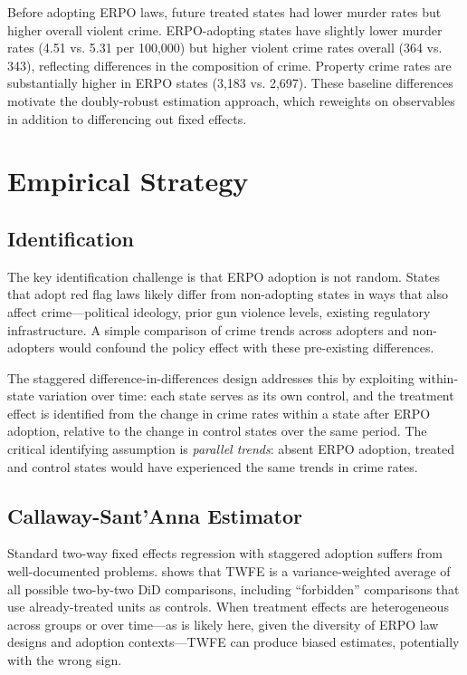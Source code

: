 \documentclass[12pt]{article}
\begin{document}
Before adopting ERPO laws, future treated states had lower murder rates but higher overall violent crime. ERPO-adopting states have slightly lower murder rates (4.51 vs. 5.31 per 100,000) but higher violent crime rates overall (364 vs. 343), reflecting differences in the composition of crime. Property crime rates are substantially higher in ERPO states (3,183 vs. 2,697). These baseline differences motivate the doubly-robust estimation approach, which reweights on observables in addition to differencing out fixed effects.


\section{Empirical Strategy}

\subsection{Identification}

The key identification challenge is that ERPO adoption is not random. States that adopt red flag laws likely differ from non-adopting states in ways that also affect crime---political ideology, prior gun violence levels, existing regulatory infrastructure. A simple comparison of crime trends across adopters and non-adopters would confound the policy effect with these pre-existing differences.

The staggered difference-in-differences design addresses this by exploiting within-state variation over time: each state serves as its own control, and the treatment effect is identified from the change in crime rates within a state after ERPO adoption, relative to the change in control states over the same period. The critical identifying assumption is \textit{parallel trends}: absent ERPO adoption, treated and control states would have experienced the same trends in crime rates.

\subsection{Callaway-Sant'Anna Estimator}

Standard two-way fixed effects regression with staggered adoption suffers from well-documented problems. \citet{goodman2021difference} shows that TWFE is a variance-weighted average of all possible two-by-two DiD comparisons, including ``forbidden'' comparisons that use already-treated units as controls. When treatment effects are heterogeneous across groups or over time---as is likely here, given the diversity of ERPO law designs and adoption contexts---TWFE can produce biased estimates, potentially with the wrong sign.
\end{document}
